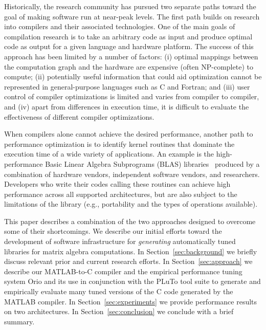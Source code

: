 \documentclass[runningheads]{llncs}
\begin{document}
Historically, the research community has pursued two separate paths toward
the goal of making software run at near-peak levels.  The first path builds
on research into compilers and their associated technologies.  One of the
main goals of compilation research is to take an arbitrary code as input and
produce optimal code as output for a given language and hardware platform.
The success of this approach has been limited by a number of factors: (i)
optimal mappings between the computation graph and the hardware are expensive
(often NP-complete) to compute; (ii) potentially useful information that
could aid optimization cannot be represented in general-purpose languages
such as C and Fortran; and (iii) user control of compiler optimizations is
limited and varies from compiler to compiler, and (iv) apart from differences
in execution time, it is difficult to evaluate the effectiveness of
different compiler optimizations.

When compilers alone cannot achieve the desired performance, 
another path to performance optimization is to identify kernel
routines that dominate the execution time of a wide variety of
applications.  
An example is the high-performance Basic Linear Algebra Subprograms 
(BLAS) libraries~\cite{BLAS} produced by a combination
of hardware vendors, independent software vendors, and researchers.
Developers who write their codes calling these routines can achieve high
performance across all supported architectures, but are also subject to 
the limitations of the library (e.g., portability and the types of operations available).

This paper describes a combination of the two approaches designed to overcome
some of their shortcomings. We describe our initial efforts toward the
development of software infrastructure for \emph{generating} automatically
tuned libraries for matrix algebra computations.  In
Section~\ref{sec:background} we briefly discuss relevant prior and current
research efforts. In Section~\ref{sec:approach} we describe our
MATLAB-to-C compiler and the empirical performance
tuning system Orio and its use in conjunction with the PLuTo tool suite to
generate and empirically evaluate many tuned versions of the C code generated
by the MATLAB compiler.  In Section~\ref{sec:experiments} we provide
performance results on two architectures. In Section~\ref{sec:conclusion} we conclude 
with a brief summary.
\end{document}
